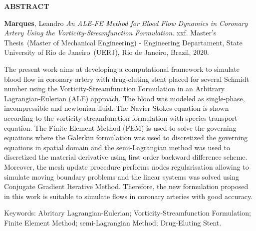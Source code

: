 \begin{center}
\textbf{ABSTRACT}
\end{center}


$\!$\\

\hspace{-1.3cm}\textbf{Marques}, Leandro \textit{An ALE-FE Method for Blood Flow Dynamics in Coronary Artery Using the Vorticity-Streamfunction Formulation}. xxf. Master's Thesis~(Master of Mechanical Engineering) - Engineering Departament, State University of Rio de Janeiro~(UERJ), Rio de Janeiro, Brazil, 2020.

\vspace{.2cm}

\indent 
The present work aims at developing a 
computational framework to simulate blood flow 
in coronary artery with
drug-eluting stent placed for several Schmidt number using the Vorticity-Streamfunction 
Formulation in an Arbitrary Lagrangian-Eulerian (ALE) approach.
The blood was modeled as single-phase, incompressible 
and newtonian fluid. The Navier-Stokes equation is 
shown according to the vorticity-streamfunction 
formulation with species transport equation.
The Finite Element Method (FEM) is used to solve 
the governing equations where the Galerkin formulation was used
to discretized the governing equations in spatial domain 
and the semi-Lagrangian method was used to discretized 
the material derivative using first order backward difference scheme. 
Moreover, the mesh update procedure performs nodes regularisation
allowing to simulate moving boundary problems and
the linear systems was solved using Conjugate 
Gradient Iterative Method.
Therefore, the new formulation proposed in this work 
is suitable to simulate flows in coronary arteries with good accuracy. 

\vspace{1cm}

\hspace{-1.3cm}Keywords: Abritary Lagrangian-Eulerian; Vorticity-Streamfunction Formulation; Finite Element Method; semi-Lagrangian Method; Drug-Eluting Stent.
